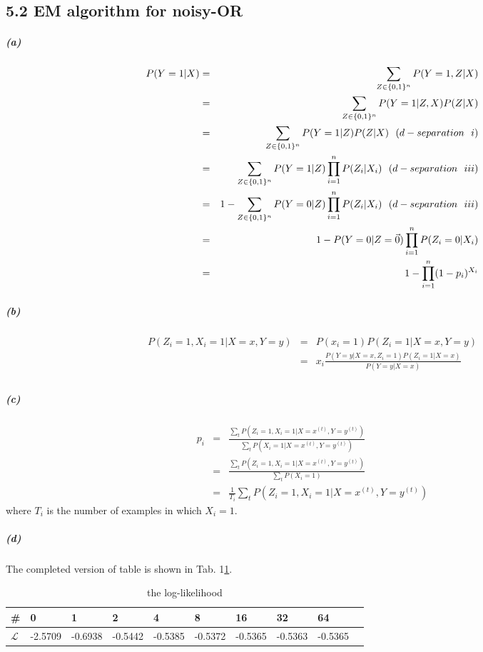 \documentclass{article}
\newcommand{\RNum}[1]{\uppercase\expandafter{\romannumeral #1\relax}}
\begin{document}
\subsection*{5.2 EM algorithm for noisy-OR}
\subparagraph*{(a)}
\begin{eqnarray*}
	P(Y = 1| X) &=& \sum_{Z \in \{0,1\}^n}P(Y =1 ,Z | X)\\	
	&=& \sum_{Z \in \{0,1\}^n}P(Y =1 |Z , X) P(Z|X)\\
	&=& \sum_{Z \in \{0,1\}^n}P(Y=1|Z)P(Z|X)~~(d-separation~~\RNum{1})\\
	&=& \sum_{Z \in \{0,1\}^n}P(Y=1|Z)\prod_{i=1}^{n}P(Z_i|X_i)~~(d-separation~~\RNum{3})\\
	&=& 1- \sum_{Z \in \{0,1\}^n}P(Y=0|Z)\prod_{i=1}^{n}P(Z_i|X_i)~~(d-separation~~\RNum{3})\\
	&=& 1- P(Y=0|Z=\vec{0})\prod_{i=1}^{n}P(Z_i=0|X_i)\\
	&=& 1 - \prod_{i=1}^{n}(1-p_i)^{X_i}
\end{eqnarray*}

\subparagraph*{(b)}
\begin{eqnarray*}
	P(Z_i = 1, X_i = 1| X=x, Y=y) &=& P(x_i = 1)P(Z_i = 1|X=x, Y=y)\\
	&=& x_i \frac{P(Y=y|X=x, Z_i = 1)P(Z_i = 1|X=x)}{P(Y=y|X=x)}\\
\end{eqnarray*}

\subparagraph*{(c)}
\begin{eqnarray*}
	p_i &=& \frac{\sum_{t}P(Z_i=1, X_i=1| X=x^{(t)}, Y=y^{(t)})}{\sum_{t}P(X_i=1| X=x^{(t)}, Y=y^{(t)})}\\
	&=& \frac{\sum_{t}P(Z_i=1, X_i=1| X=x^{(t)}, Y=y^{(t)})}{\sum_{t}P(X_i=1)}\\
	&=& \frac{1}{T_i}\sum_{t}P(Z_i=1, X_i=1| X=x^{(t)}, Y=y^{(t)})
\end{eqnarray*}
where $T_i$ is the number of examples in which $X_i=1$.

\subparagraph*{(d)}
The completed version of table is shown in Tab. 1\ref{hw5.2}.
\begin{table}
	\centering
	\begin{tabular}{|p{1.2cm}|p{1.2cm}|p{1.2cm}|p{1.2cm}|p{1.2cm}|p{1.2cm}|p{1.2cm}|p{1.2cm}|p{1.2cm}|p{1.2cm}|}
		\hline
		\#  & 0 & 1 & 2 & 4 & 8 & 16 & 32 & 64\\
		\hline 
		 $\mathcal{L}$& -2.5709 & -0.6938 & -0.5442 & -0.5385 & -0.5372 & -0.5365 & -0.5363 & -0.5365\\
		\hline
	\end{tabular}
	\label{hw5.2}
	\caption{the log-likelihood}
\end{table}
\end{document}
